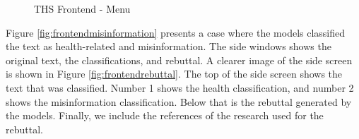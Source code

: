 \begin{figure}[H]
	\begin{center}
	\end{center}

	\caption{THS Frontend - Menu} %
	\label{fig:Menu}
\end{figure}

Figure \ref{fig:frontendmisinformation} presents a case where the models classified the text as health-related and misinformation. The side windows shows the original text, the classifications, and rebuttal. A clearer image of the side screen is shown in Figure \ref{fig:frontendrebuttal}. The top of the side screen shows the text that was classified. Number 1 shows the health classification, and number 2 shows the misinformation classification. Below that is the rebuttal generated by the models. Finally, we include the references of the research used for the rebuttal. 


